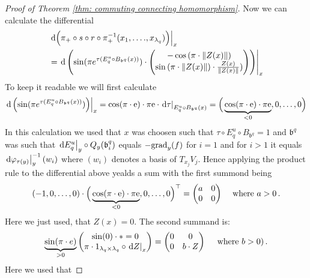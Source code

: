 \begin{proof}[Proof of Theorem \ref{thm: commuting connecting homomorphism}]
		Now we can calculate the differential 
		\begin{align*}
			&   \left.\mathop{}\!\mathrm{d} \Big( \pi_+\circ s\circ r\circ \pi_+^{-1}(x_1,\dots .,x_{\lambda_q})\Big)\right|_{x}\\
			&=  \left.\mathop{}\!\mathrm{d} \left(\sin(\pi e^{\tau(E^u_q\circ B_{\mathfrak{b}^q}(x))}) \cdot
				\begin{pmatrix}
					-\cos\left(\pi \cdot \left\lVert Z(x)\right\rVert\right)\\
					\sin\left(\pi \cdot \left\lVert Z(x)\right\rVert\right) \cdot \frac{Z(x)}{\left\lVert Z(x)\right\rVert})
				\end{pmatrix}\right)\right|_{x}
		\end{align*} To keep it readable we will first calculate
		\begin{equation*} 
			\left.	\mathop{}\!\mathrm{d} \left(\sin(\pi e^{\tau(E^u_q\circ B_{\mathfrak{b}^q}(x))})\right)\right|_{x}=\cos(\pi\cdot \mathrm{e} )\cdot \pi \mathrm{e} \cdot \left.\mathop{}\!\mathrm{d} \tau \right|_{E^u_q\circ B_{\mathfrak{b}^q}(x)}=\Big(\underbrace{\cos(\pi\cdot \mathrm{e} )\cdot \pi \mathrm{e}}_{<0},0,\dots,0\Big) 
		\end{equation*} 
		In this calculation we used that $x$ was choosen such that $\tau\circ E^u_q \circ B_{\mathfrak{b}^q}=1$ and $\mathfrak{b}^q$ was such that $\left.\mathop{}\!\mathrm{d} E^u_q\right|_{y}\circ Q_y(\mathfrak{b}^q_i)$ equals $-\mathrm{grad}_{y}(f)$ for $i=1$ and for $i>1$ it equals $\left.\mathop{}\!\mathrm{d} \varphi_{\tau(y)}\right|_{y}^{-1}({w_i})$ where $(w_i)$ denotes a basis of $T_{x_j}V_j$. Hence applying the product rule to the differential above yealds a sum with the first summond being
		\begin{equation*}
			\left(-1,0,\dots,0\right)\cdot 	\Big(\underbrace{\cos(\pi\cdot \mathrm{e} )\cdot \pi \mathrm{e}}_{<0},0,\dots,0\Big)^\top=
			\begin{pmatrix}
				a&0\\
				0&0
			\end{pmatrix} \, \quad \text{where  }a>0\,.
		\end{equation*} Here we just used, that $Z(x)=0$. The second summand is:
		\begin{equation*}
			\underbrace{\sin(\pi\cdot e)}_{>0}\begin{pmatrix}
				\sin(0)\cdot *=0\\
				\pi\cdot 1_{\lambda_q\times \lambda_q}\circ \left.\mathop{}\!\mathrm{d} Z\right|_{x}
			\end{pmatrix}=\begin{pmatrix}
				0&0\\
				0&b\cdot Z
			\end{pmatrix}\quad \text{ where $b>0$)}\,.
		\end{equation*} Here we used that

\end{proof}
